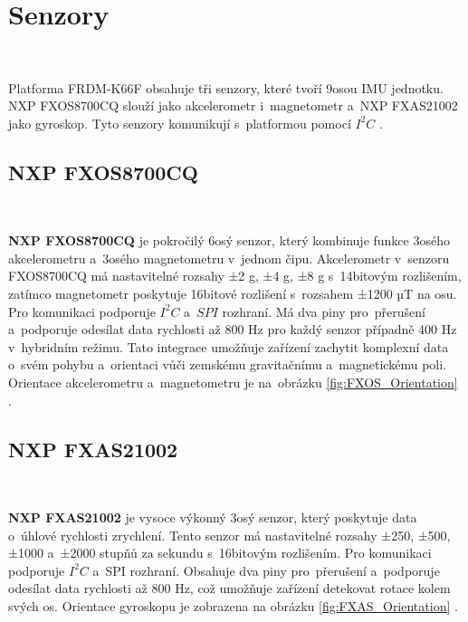 \chapter{Senzory}
\label{sec:Sensors}\

Platforma FRDM-K66F obsahuje tři senzory, které tvoří 9osou IMU jednotku.
NXP FXOS8700CQ slouží jako akcelerometr i~magnetometr a~NXP FXAS21002 jako gyroskop.
Tyto senzory komunikují s~platformou pomocí $I^2C$ \cite{frdmk66UserGuide}.

\section{NXP FXOS8700CQ}\

\textbf{NXP FXOS8700CQ} je pokročilý 6osý senzor, který kombinuje funkce 3osého
akcelerometru a~3osého magnetometru v~jednom čipu. Akcelerometr v~senzoru
FXOS8700CQ má nastavitelné rozsahy ±2 g, ±4 g, ±8 g s~14bitovým rozlišením, 
zatímco magnetometr poskytuje 16bitové rozlišení s~rozsahem ±1200 µT na osu. 
Pro komunikaci podporuje $I^2C$ a~$SPI$ rozhraní. Má dva piny pro~přerušení 
a~podporuje odesílat data rychlosti až 800 Hz pro každý senzor případně 400 Hz 
v~hybridním režimu. Tato integrace umožňuje zařízení zachytit komplexní 
data o~svém pohybu a~orientaci vůči zemskému gravitačnímu a~magnetickému poli. 
Orientace akcelerometru a~magnetometru je na~obrázku \ref{fig:FXOS_Orientation} 
\cite{FXOS8700CQ}.

\section{NXP FXAS21002}\

\textbf{NXP FXAS21002} je vysoce výkonný 3osý senzor, který poskytuje 
data o~úhlové rychlosti zrychlení. Tento senzor má nastavitelné rozsahy 
±250, ±500, ±1000 a~±2000 stupňů za sekundu s~16bitovým rozlišením. 
Pro komunikaci podporuje $I^2C$ a~SPI rozhraní. Obsahuje dva piny pro~přerušení 
a~podporuje odesílat data rychlosti až 800 Hz, což umožňuje zařízení detekovat 
rotace kolem svých os. Orientace gyroskopu je zobrazena na obrázku 
\ref{fig:FXAS_Orientation} \cite{FXAS21002}.

